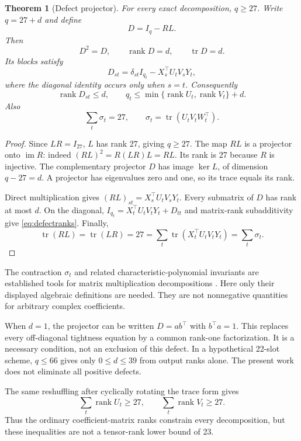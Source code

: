 \documentclass[11pt]{article}
\newtheorem{theorem}{Theorem}[section]
\theoremstyle{definition}\newtheorem{definition}[theorem]{Definition}
\newcommand{\rank}{\operatorname{rank}}
\newcommand{\tr}{\operatorname{tr}}
\newcommand{\im}{\operatorname{im}}
\begin{document}
\begin{theorem}[Defect projector]\label{thm:defect}
For every exact decomposition, $q\ge27$. Write $q=27+d$ and define
\begin{equation}\label{eq:defect}
D=I_q-RL.
\end{equation}
Then
\[
D^2=D,\qquad \rank D=d,\qquad \tr D=d.
\]
Its blocks satisfy
\begin{equation}\label{eq:defectblocks}
D_{st}=\delta_{st}I_{q_t}-X_s^\top U_tV_sY_t,
\end{equation}
where the diagonal identity occurs only when $s=t$. Consequently
\begin{equation}\label{eq:defectranks}
\rank D_{st}\le d,\qquad
q_t\le\min\{\rank U_t,\rank V_t\}+d.
\end{equation}
Also
\begin{equation}\label{eq:sigsum}
\sum_t\sigma_t=27,\qquad \sigma_t=\tr(U_tV_tW_t^\top).
\end{equation}
\end{theorem}
\begin{proof}
Since $LR=I_{27}$, $L$ has rank 27, giving $q\ge27$. The map $RL$ is a projector onto $\im R$: indeed $(RL)^2=R(LR)L=RL$. Its rank is 27 because $R$ is injective. The complementary projector $D$ has image $\ker L$, of dimension $q-27=d$. A projector has eigenvalues zero and one, so its trace equals its rank.

Direct multiplication gives $(RL)_{st}=X_s^\top U_tV_sY_t$. Every submatrix of $D$ has rank at most $d$. On the diagonal, $I_{q_t}=X_t^\top U_tV_tY_t+D_{tt}$ and matrix-rank subadditivity give \eqref{eq:defectranks}. Finally,
\[
\tr(RL)=\tr(LR)=27
=\sum_t\tr(X_t^\top U_tV_tY_t)=\sum_t\sigma_t.
\]
\end{proof}

The contraction $\sigma_t$ and related characteristic-polynomial invariants are established tools for matrix multiplication decompositions \cite{signature}. Here only their displayed algebraic definitions are needed. They are not nonnegative quantities for arbitrary complex coefficients.

When $d=1$, the projector can be written $D=ab^\top$ with $b^\top a=1$. This replaces every off-diagonal tightness equation by a common rank-one factorization. It is a necessary condition, not an exclusion of this defect. In a hypothetical 22-slot scheme, $q\le66$ gives only $0\le d\le39$ from output ranks alone. The present work does not eliminate all positive defects.

The same reshuffling after cyclically rotating the trace form gives
\[
\sum_t\rank U_t\ge27,\qquad \sum_t\rank V_t\ge27.
\]
Thus the ordinary coefficient-matrix ranks constrain every decomposition, but these inequalities are not a tensor-rank lower bound of 23.
\end{document}
